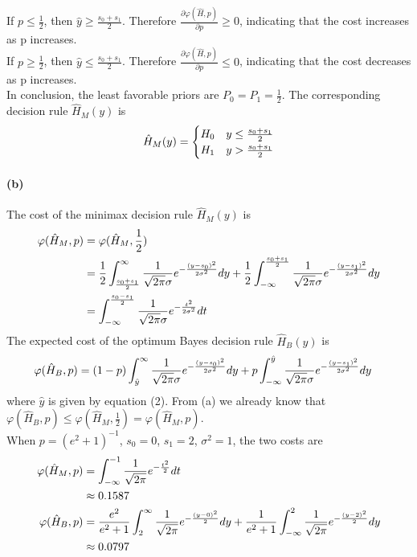 \documentclass{article}
\begin{document}
If $p\le \frac{1}{2}$, then $\hat{y}\ge \frac{s_0+s_1}{2}$. Therefore $\frac{\partial \varphi(\hat{H},p)}{\partial p}\ge 0$, indicating that the cost increases as p increases. \\
If $p\ge \frac{1}{2}$, then $\hat{y}\le \frac{s_0+s_1}{2}$. Therefore $\frac{\partial \varphi(\hat{H},p)}{\partial p}\le 0$, indicating that the cost decreases as p increases.\\
In conclusion, the least favorable priors are $P_0=P_1=\frac{1}{2}$. The corresponding decision rule $\hat{H}_M(y)$ is
\begin{align}
	\hat{H}_M(y)=\begin{cases}
		H_0&y\le \frac{s_0+s_1}{2}\\
		H_1&y>\frac{s_0+s_1}{2}
	\end{cases}\notag
\end{align}

\paragraph{(b)}
The cost of the minimax decision rule $\hat{H}_M(y)$ is
\begin{align}
	\varphi(\hat{H}_M,p)&=\varphi(\hat{H}_M,\frac{1}{2})\notag\\
	&=\frac{1}{2}\int^{\infty}_{\frac{s_0+s_1}{2}}\frac{1}{\sqrt{2\pi}\sigma}e^{-\frac{(y-s_0)^2}{2\sigma^2}}dy+\frac{1}{2}\int^{\frac{s_0+s_1}{2}}_{-\infty}\frac{1}{\sqrt{2\pi}\sigma}e^{-\frac{(y-s_1)^2}{2\sigma^2}}dy\notag\\
	&=\int^{\frac{s_0-s_1}{2}}_{-\infty}\frac{1}{\sqrt{2\pi}\sigma}e^{-\frac{t^2}{2\sigma^2}}dt\notag
\end{align}
The expected cost of the optimum Bayes decision rule $\hat{H}_B(y)$ is
\begin{align}
	\varphi(\hat{H}_B,p)&=(1-p)\int^{\infty}_{\hat{y}}\frac{1}{\sqrt{2\pi}\sigma}e^{-\frac{(y-s_0)^2}{2\sigma^2}}dy+p\int^{\hat{y}}_{-\infty}\frac{1}{\sqrt{2\pi}\sigma}e^{-\frac{(y-s_1)^2}{2\sigma^2}}dy\notag
\end{align}
where $\hat{y}$ is given by equation (2). From (a) we already know that $\varphi(\hat{H}_B,p)\le \varphi(\hat{H}_M,\frac{1}{2})=\varphi(\hat{H}_M,p)$.\\
When $p=(e^2+1)^{-1}$, $s_0=0$, $s_1=2$, $\sigma^2=1$, the two costs are
\begin{align}
	\varphi(\hat{H}_M,p)&=\int^{-1}_{-\infty}\frac{1}{\sqrt{2\pi}}e^{-\frac{t^2}{2}}dt\notag\\
	&\approx 0.1587\notag \\
	\varphi(\hat{H}_B,p)&=\frac{e^2}{e^2+1}\int^{\infty}_{2}\frac{1}{\sqrt{2\pi}}e^{-\frac{(y-0)^2}{2}}dy+\frac{1}{e^2+1}\int^{2}_{-\infty}\frac{1}{\sqrt{2\pi}}e^{-\frac{(y-2)^2}{2}}dy\notag\\
	&\approx 0.0797\notag
\end{align}
\end{document}

